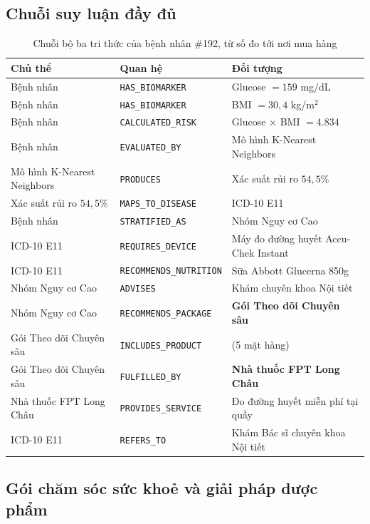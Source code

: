 \subsection{Chuỗi suy luận đầy đủ}

\begin{table}[H]
\centering
\caption{Chuỗi bộ ba tri thức của bệnh nhân \#192, từ số đo tới nơi mua hàng}
\label{tab:triplet-dia}
\scriptsize
\begin{tabularx}{\textwidth}{@{}L{4.1cm}L{3.5cm}X@{}}
\toprule
\textbf{Chủ thể} & \textbf{Quan hệ} & \textbf{Đối tượng} \\
\midrule
Bệnh nhân & \texttt{HAS\_BIOMARKER} & Glucose $=159$ mg/dL \\
Bệnh nhân & \texttt{HAS\_BIOMARKER} & BMI $=30{,}4$ kg/m$^2$ \\
Bệnh nhân & \texttt{CALCULATED\_RISK} & Glucose $\times$ BMI $=4.834$ \\
Bệnh nhân & \texttt{EVALUATED\_BY} & Mô hình K-Nearest Neighbors \\
Mô hình K-Nearest Neighbors & \texttt{PRODUCES} & Xác suất rủi ro $54{,}5\%$ \\
Xác suất rủi ro $54{,}5\%$ & \texttt{MAPS\_TO\_DISEASE} & ICD-10 E11 \\
Bệnh nhân & \texttt{STRATIFIED\_AS} & Nhóm Nguy cơ Cao \\
ICD-10 E11 & \texttt{REQUIRES\_DEVICE} & Máy đo đường huyết Accu-Chek Instant \\
ICD-10 E11 & \texttt{RECOMMENDS\_NUTRITION} & Sữa Abbott Glucerna 850g \\
Nhóm Nguy cơ Cao & \texttt{ADVISES} & Khám chuyên khoa Nội tiết \\
Nhóm Nguy cơ Cao & \texttt{RECOMMENDS\_PACKAGE} & \textbf{Gói Theo dõi Chuyên sâu} \\
Gói Theo dõi Chuyên sâu & \texttt{INCLUDES\_PRODUCT} & (5 mặt hàng) \\
Gói Theo dõi Chuyên sâu & \texttt{FULFILLED\_BY} & \textbf{Nhà thuốc FPT Long Châu} \\
Nhà thuốc FPT Long Châu & \texttt{PROVIDES\_SERVICE} & Đo đường huyết miễn phí tại quầy \\
ICD-10 E11 & \texttt{REFERS\_TO} & Khám Bác sĩ chuyên khoa Nội tiết \\
\bottomrule
\end{tabularx}
\end{table}

\subsection{Gói chăm sóc sức khoẻ và giải pháp dược phẩm}
\label{sec:goi-cham-soc}

